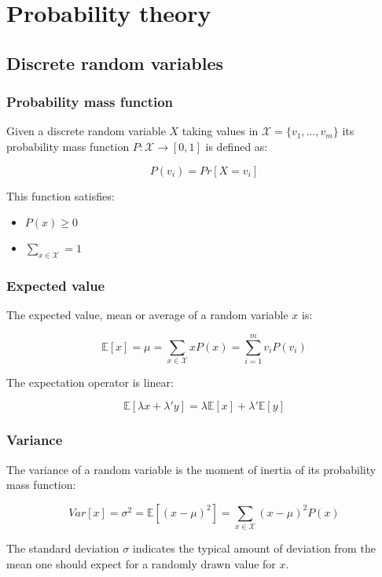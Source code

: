 \chapter{Probability theory}

\section{Discrete random variables}

	\subsection{Probability mass function}
	Given a discrete random variable $X$ taking values in $\mathcal{X} = \{v_1, \dots, v_m\}$ its probability mass function $P:\mathcal{X}\rightarrow [0,1]$ is defined as:

	$$P(v_i) = Pr[X = v_i]$$

	This function satisfies:

	\begin{multicols}{2}
		\begin{itemize}
			\item $P(x) \ge 0$
			\item $\sum\limits_{x\in \mathcal{X}} = 1$
		\end{itemize}
	\end{multicols}

	\subsection{Expected value}
	The expected value, mean or average of a random variable $x$ is:

	$$\mathbb{E}[x] = \mu = \sum\limits_{x\in\mathcal{X}}xP(x) = \sum\limits_{i=1}^mv_iP(v_i)$$

	The expectation operator is linear:

	$$\mathbb{E}[\lambda x + \lambda'y] = \lambda\mathbb{E}[x] + \lambda'\mathbb{E}[y]$$

	\subsection{Variance}
	The variance of a random variable is the moment of inertia of its probability mass function:

	$$Var[x] = \sigma^2 = \mathbb{E}[(x-\mu)^2] = \sum\limits_{x\in\mathcal{X}}(x-\mu)^2P(x)$$

	The standard deviation $\sigma$ indicates the typical amount of deviation from the mean one should expect for a randomly drawn value for $x$.

